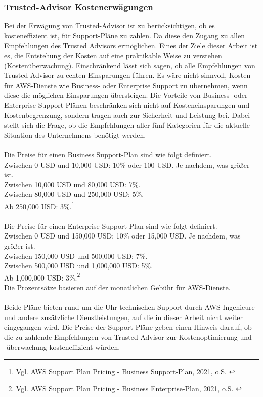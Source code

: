 \subsubsection*{Trusted-Advisor Kostenerwägungen}
Bei der Erwägung von Trusted-Advisor ist zu berücksichtigen, ob es kosteneffizient ist, für Support-Pläne zu zahlen. Da diese den Zugang zu allen Empfehlungen des Trusted Advisors ermöglichen. Eines der Ziele dieser Arbeit ist es, die Entstehung der Kosten auf eine praktikable Weise zu verstehen (Kostenüberwachung). Einschränkend lässt sich sagen, ob alle Empfehlungen von Trusted Advisor zu echten Einsparungen führen. %
Es wäre nicht sinnvoll, Kosten für AWS-Dienste wie Business- oder Enterprise Support zu übernehmen, wenn diese die möglichen Einsparungen übersteigen. Die Vorteile von Business- oder Enterprise Support-Plänen beschränken sich nicht auf Kosteneinsparungen und Kostenbegrenzung, sondern tragen auch zur Sicherheit und Leistung bei. Dabei stellt sich die Frage, ob die Empfehlungen aller fünf Kategorien für die aktuelle Situation des Unternehmens benötigt werden.
\\\\   
Die Preise für einen Business Support-Plan sind wie folgt definiert. 
\\
Zwischen 0 USD und 10,000 USD: 10\% oder 100 USD. Je nachdem, was größer ist.\\
Zwischen 10,000 USD und 80,000 USD: 7\%.\\
Zwischen 80,000 USD und 250,000 USD: 5\%.\\
Ab 250,000 USD: 3\%.\footnote{Vgl.  AWS Support Plan Pricing - Business Support-Plan, 2021, o.S. \cite{AMZ38}}
\\\\
Die Preise für einen Enterprise Support-Plan sind wie folgt definiert.
\\
Zwischen 0 USD und 150,000 USD: 10\% oder 15,000 USD. Je nachdem, was größer ist.\\
Zwischen 150,000 USD und 500,000 USD: 7\%.\\
Zwischen 500,000 USD und 1,000,000 USD: 5\%.\\
Ab 1,000,000 USD: 3\%.\footnote{Vgl.  AWS Support Plan Pricing - Business Enterprise-Plan, 2021, o.S. \cite{AMZ38}}\\
Die Prozentsätze basieren auf der monatlichen Gebühr für AWS-Dienste.
\\\\
Beide Pläne bieten rund um die Uhr technischen Support durch AWS-Ingenieure und andere zusätzliche Dienstleistungen, auf die in dieser Arbeit nicht weiter eingegangen wird. Die Preise der Support-Pläne geben einen Hinweis darauf, ob die zu zahlende Empfehlungen von Trusted Advisor zur Kostenoptimierung und -überwachung kosteneffizient würden.

